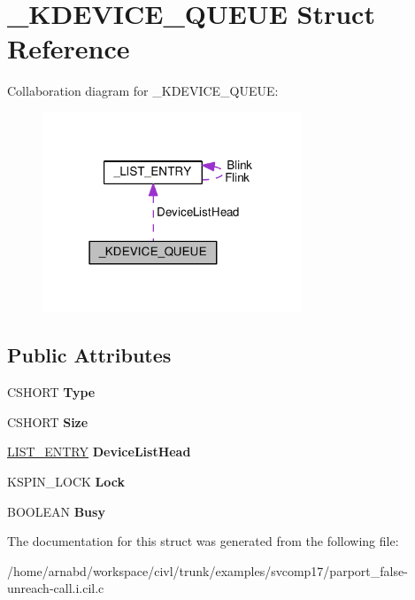 \hypertarget{struct__KDEVICE__QUEUE}{}\section{\+\_\+\+K\+D\+E\+V\+I\+C\+E\+\_\+\+Q\+U\+E\+U\+E Struct Reference}
\label{struct__KDEVICE__QUEUE}


Collaboration diagram for \+\_\+\+K\+D\+E\+V\+I\+C\+E\+\_\+\+Q\+U\+E\+U\+E\+:
\nopagebreak
\begin{figure}[H]
\begin{center}
\leavevmode
\includegraphics[width=219pt]{struct__KDEVICE__QUEUE__coll__graph}
\end{center}
\end{figure}
\subsection*{Public Attributes}
\begin{DoxyCompactItemize}
\item 
\hypertarget{struct__KDEVICE__QUEUE_a7ac9819697d693e29c2e577632977c19}{}C\+S\+H\+O\+R\+T {\bfseries Type}\label{struct__KDEVICE__QUEUE_a7ac9819697d693e29c2e577632977c19}

\item 
\hypertarget{struct__KDEVICE__QUEUE_a808e74a71ecb66effddb72ccc77945a7}{}C\+S\+H\+O\+R\+T {\bfseries Size}\label{struct__KDEVICE__QUEUE_a808e74a71ecb66effddb72ccc77945a7}

\item 
\hypertarget{struct__KDEVICE__QUEUE_a3679d44ffb706274d6f2c4a788bf11f2}{}\hyperlink{struct__LIST__ENTRY}{L\+I\+S\+T\+\_\+\+E\+N\+T\+R\+Y} {\bfseries Device\+List\+Head}\label{struct__KDEVICE__QUEUE_a3679d44ffb706274d6f2c4a788bf11f2}

\item 
\hypertarget{struct__KDEVICE__QUEUE_a6ee723cdd732d39313e47f60776e6d90}{}K\+S\+P\+I\+N\+\_\+\+L\+O\+C\+K {\bfseries Lock}\label{struct__KDEVICE__QUEUE_a6ee723cdd732d39313e47f60776e6d90}

\item 
\hypertarget{struct__KDEVICE__QUEUE_a03ed2b614b7dde7bad0a48ad88a90d70}{}B\+O\+O\+L\+E\+A\+N {\bfseries Busy}\label{struct__KDEVICE__QUEUE_a03ed2b614b7dde7bad0a48ad88a90d70}

\end{DoxyCompactItemize}


The documentation for this struct was generated from the following file\+:\begin{DoxyCompactItemize}
\item 
/home/arnabd/workspace/civl/trunk/examples/svcomp17/parport\+\_\+false-\/unreach-\/call.\+i.\+cil.\+c\end{DoxyCompactItemize}
